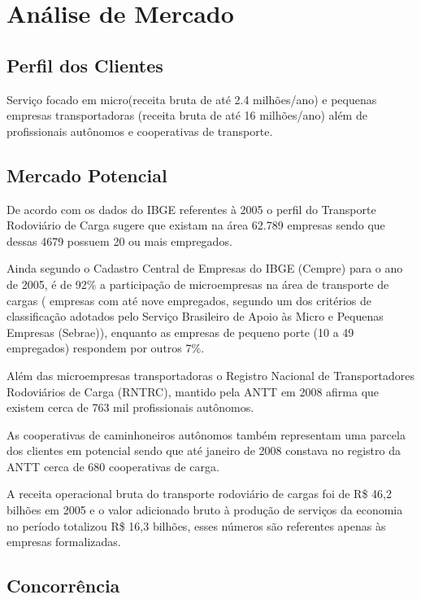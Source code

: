 \chapter{Análise de Mercado}\label{mercado}

\section{Perfil dos Clientes}

  Serviço focado em micro(receita bruta de até 2.4 milhões/ano) e pequenas empresas transportadoras (receita bruta de até 16 milhões/ano) além de profissionais autônomos e cooperativas de transporte.

\section{Mercado Potencial}

  De acordo com os dados do IBGE referentes à 2005 o perfil do Transporte Rodoviário de Carga sugere que existam na área 62.789 empresas sendo que dessas 4679 possuem 20 ou mais empregados.

  Ainda segundo o Cadastro Central de Empresas do IBGE (Cempre) para o ano de 2005, é de 92\% a participação de microempresas na área de transporte de cargas ( empresas com até nove empregados, segundo um dos critérios de classificação adotados pelo Serviço Brasileiro de Apoio às Micro e Pequenas Empresas (Sebrae)), enquanto as empresas de pequeno porte (10 a 49 empregados) respondem por outros 7\%.

  Além das microempresas transportadoras o  Registro Nacional de Transportadores Rodoviários de Carga (RNTRC), mantido pela ANTT em 2008 afirma que existem cerca de 763 mil profissionais autônomos.
  
  As cooperativas de caminhoneiros autônomos também representam uma parcela dos clientes em potencial sendo que até janeiro de 2008 constava no registro da ANTT cerca de 680 cooperativas de carga.

  A receita operacional bruta do transporte rodoviário de cargas foi de R\$ 46,2 bilhões em 2005 e o valor adicionado bruto à produção de serviços da economia no período totalizou R\$ 16,3 bilhões, esses números são referentes apenas às empresas formalizadas.

\section{Concorrência}

